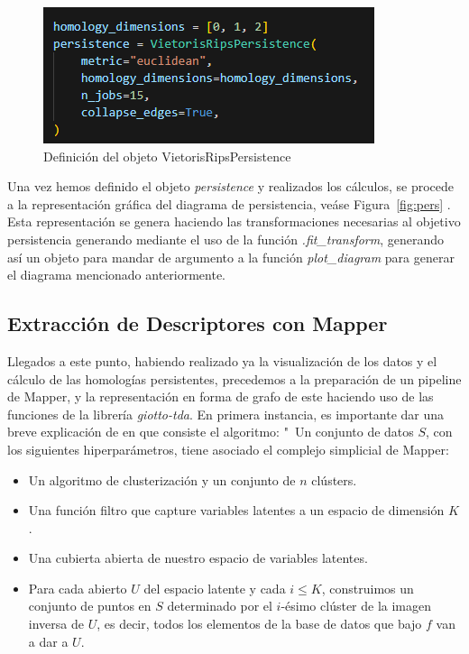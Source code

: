 \begin{figure}[h]
    \centering
    \includegraphics[scale=0.7]{images/codigo_persistencia.png}
    \caption{Definición del objeto VietorisRipsPersistence}
    \label{fig:codigo}
\end{figure}

Una vez hemos definido el objeto \textit{persistence} y realizados los cálculos, se procede a la representación gráfica del diagrama de persistencia, veáse Figura~\ref{fig:pers} . Esta representación se genera haciendo las transformaciones necesarias al objetivo persistencia generando mediante el uso de la función \textit{.fit\_transform}, generando así un objeto para mandar de argumento a la función \textit{plot\_diagram} para generar el diagrama mencionado anteriormente.

\subsection{Extracción de Descriptores con Mapper}

Llegados a este punto, habiendo realizado ya la visualización de los datos y el cálculo de las homologías persistentes, precedemos a la preparación de un pipeline de Mapper, y la representación en forma de grafo de este haciendo uso de las funciones de la librería \textit{giotto-tda}. En primera instancia, es importante dar una breve explicación de en que consiste el algoritmo: "\ Un conjunto de datos $S$, con los siguientes hiperparámetros, tiene asociado el complejo simplicial de Mapper:

\begin{itemize}
    \item Un algoritmo de clusterización y un conjunto de $n$ clústers.
    \item Una función filtro que capture variables latentes a un espacio de dimensión $K$.
    \item Una cubierta abierta de nuestro espacio de variables latentes.
    \item Para cada abierto $U$ del espacio latente y cada $i \leq K$, construimos un conjunto de puntos en $S$ determinado por el $i$-ésimo clúster de la imagen inversa de $U$, es decir, todos los elementos de la base de datos que bajo $f$ van a dar a $U$.
\end{itemize}

